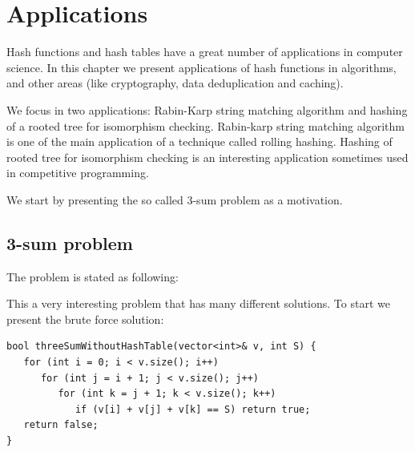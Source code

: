 \chapter{Applications}
\label{cap:Applications}


Hash functions and hash tables have a great number of applications in computer science. In this chapter we present applications of hash functions in algorithms, and other areas (like cryptography, data deduplication and caching).

We focus in two applications: Rabin-Karp \citep{RabinKarpWiki} string matching algorithm and hashing of a rooted tree for isomorphism checking. Rabin-karp string matching algorithm is one of the main application of a technique called rolling hashing. Hashing of rooted tree for isomorphism checking \citep{TreeIsomorphism} is an interesting application sometimes used in competitive programming.

We start by presenting the so called 3-sum problem as a motivation.

\section{3-sum problem}
The problem is stated as following:

\medskip


\medskip

This a very interesting problem that has many different solutions. To start we present the brute force solution:

\begin{lstlisting}
bool threeSumWithoutHashTable(vector<int>& v, int S) {
   for (int i = 0; i < v.size(); i++)
      for (int j = i + 1; j < v.size(); j++)
         for (int k = j + 1; k < v.size(); k++)
            if (v[i] + v[j] + v[k] == S) return true;
   return false;
}
\end{lstlisting}

